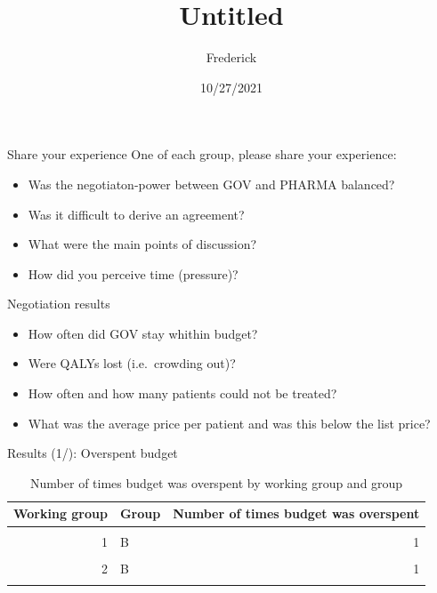 \documentclass[
  ignorenonframetext,
]{beamer}
\title{Untitled}
\author{Frederick}
\date{10/27/2021}
\providecommand{\tightlist}{%
  \setlength{\itemsep}{0pt}\setlength{\parskip}{0pt}}
\begin{document}
\frame{\titlepage}

\begin{frame}{Share your experience}
\protect\hypertarget{share-your-experience}{}
One of each group, please share your experience:

\begin{itemize}
\tightlist
\item
  Was the negotiaton-power between GOV and PHARMA balanced?
\item
  Was it difficult to derive an agreement?
\item
  What were the main points of discussion?
\item
  How did you perceive time (pressure)?
\end{itemize}
\end{frame}

\begin{frame}{Negotiation results}
\protect\hypertarget{negotiation-results}{}
\begin{itemize}
\tightlist
\item
  How often did GOV stay whithin budget?
\item
  Were QALYs lost (i.e.~crowding out)?
\item
  How often and how many patients could not be treated?
\item
  What was the average price per patient and was this below the list
  price?
\end{itemize}
\end{frame}

\begin{frame}{Results (1/): Overspent budget}
\protect\hypertarget{results-1-overspent-budget}{}
\begin{table}[H]

\caption{\label{tab:res1}Number of times budget was overspent by working group and group}
\centering
\begin{tabular}[t]{rlr}
\toprule
Working group & Group & Number of times budget was overspent\\
\midrule
\cellcolor{gray!6}{1} & \cellcolor{gray!6}{A} & \cellcolor{gray!6}{1}\\
1 & B & 1\\
\cellcolor{gray!6}{1} & \cellcolor{gray!6}{C} & \cellcolor{gray!6}{2}\\
2 & B & 1\\
\cellcolor{gray!6}{2} & \cellcolor{gray!6}{D} & \cellcolor{gray!6}{1}\\
\bottomrule
\end{tabular}
\end{table}
\end{frame}
\end{document}
